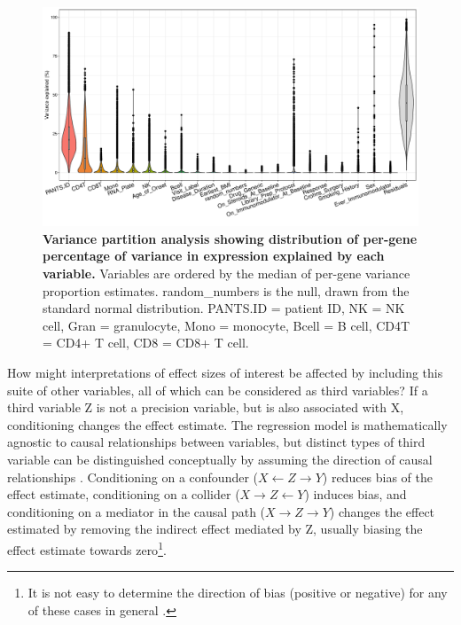 \begin{figure}
    \centering
    \includegraphics[width=1.0\textwidth,page=1]{mainmatter/figures/chapter_04/dream.plotVarPart.pdf}
    \caption{
        \textbf{Variance partition analysis showing distribution of per-gene percentage of variance in expression explained by each variable.}
        Variables are ordered by the median of per-gene variance proportion estimates.
        random\_numbers is the null, drawn from the standard normal distribution.
        PANTS.ID = patient ID, NK = \gls{NK} cell, Gran = granulocyte, Mono = monocyte, Bcell = B cell, CD4T = CD4+ T cell, CD8 = CD8+ T cell.
}
    \label{fig:multipants_varPart}
\end{figure}

How might interpretations of effect sizes of interest be affected by including this suite of other variables, all of which can be considered as third variables?
If a third variable Z is not a precision variable, but is also associated with X, conditioning changes the effect estimate.
The regression model is mathematically agnostic to causal relationships between variables,
but distinct types of third variable can be distinguished conceptually by assuming the direction of causal relationships \autocite{mackinnon2000EquivalenceMediationConfounding}.
Conditioning on a confounder ($X \leftarrow Z \rightarrow Y$) reduces bias of the effect estimate,
conditioning on a collider ($X \rightarrow Z \leftarrow Y$) induces bias,
and conditioning on a mediator in the causal path ($X \rightarrow Z \rightarrow Y$) changes the effect estimated by removing the indirect effect mediated by Z,
usually biasing the effect estimate towards zero\footnote{It is not easy to determine the direction of bias (positive or negative) for any of these cases in general \autocite{suzuki2020CausalDiagramsPitfalls}.}.

